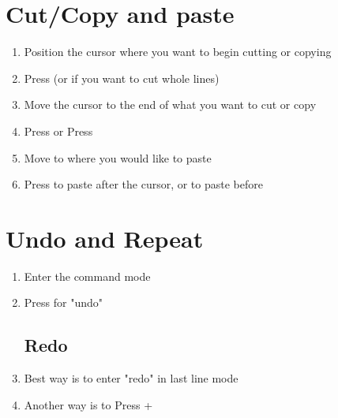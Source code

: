 \documentclass[a4paper,10pt,landscape]{article}
\begin{document}
\begin{multicols}{3}
\section{Cut/Copy and paste}
\begin{enumerate}
    \item Position the cursor where you want to begin cutting or copying
    \item Press  (or  if you want to cut whole lines)
    \item Move the cursor to the end of what you want to cut or copy
    \item Press  or Press 
    \item Move to where you would like to paste
    \item Press  to paste after the cursor, or  to paste before
\end{enumerate}
\section{Undo and Repeat}
\begin{enumerate}
    \item Enter the command mode
    \item Press  for "undo"
    \subsection{Redo}
    \item Best way is to enter "redo" in last line mode
    \item Another way is to Press +
\end{enumerate}

\end{multicols}
\end{document}
